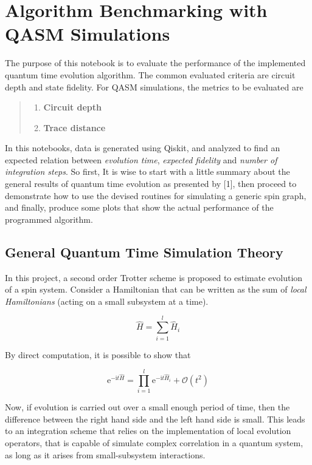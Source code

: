 \hypertarget{algorithm-benchmarking-with-qasm-simulations}{%
\section{Algorithm Benchmarking with QASM
Simulations}\label{algorithm-benchmarking-with-qasm-simulations}}

The purpose of this notebook is to evaluate the performance of the
implemented quantum time evolution algorithm. The common evaluated
criteria are circuit depth and state fidelity. For QASM simulations, the
metrics to be evaluated are

\begin{quote}
\begin{enumerate}
\def\labelenumi{\arabic{enumi}.}
\tightlist
\item
  \textbf{Circuit depth}
\item
  \textbf{Trace distance}
\end{enumerate}
\end{quote}

In this notebooks, data is generated using Qiskit, and analyzed to find
an expected relation between \emph{evolution time}, \emph{expected
fidelity} and \emph{number of integration steps}. So first, It is wise
to start with a little summary about the general results of quantum time
evolution as presented by {[}1{]}, then proceed to demonstrate how to
use the devised routines for simulating a generic spin graph, and
finally, produce some plots that show the actual performance of the
programmed algorithm.

    \hypertarget{general-quantum-time-simulation-theory}{%
\subsection{General Quantum Time Simulation
Theory}\label{general-quantum-time-simulation-theory}}

In this project, a second order Trotter scheme is proposed to estimate
evolution of a spin system. Consider a Hamiltonian that can be written
as the sum of \emph{local Hamiltonians} (acting on a small subsystem at
a time).

\[
\hat{H} = \sum_{i=1}^{l} \hat{H}_i
\]

By direct computation, it is possible to show that

\[
\mathrm{e}^{-\mathrm{i}t\hat{H}} = \prod_{i=1}^{l} \mathrm{e}^{-\mathrm{i}t\hat{H}_i} + \mathcal{O}(t^2)
\]

Now, if evolution is carried out over a small enough period of time,
then the difference between the right hand side and the left hand side
is small. This leads to an integration scheme that relies on the
implementation of local evolution operators, that is capable of simulate
complex correlation in a quantum system, as long as it arises from
small-subsystem interactions.


